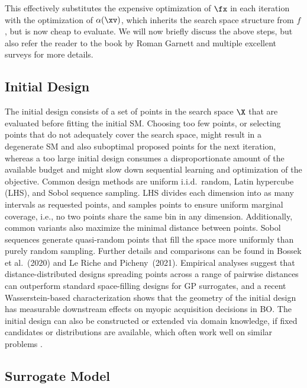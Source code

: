 \documentclass[12pt,letterpaper]{article}
\begin{document}
This effectively substitutes the expensive optimization of $\fx$ in each iteration with the optimization of $\alpha(\xv)$, which inherits the search space structure from $f$, but is now cheap to evaluate. 
We will now briefly discuss the above steps, but also refer the reader to the book by Roman Garnett\cite{garnett2023} and multiple excellent surveys\cite{brochu2010,shahriari2016,frazier2018} for more details. 


\subsection*{Initial Design}

\label{sec:initial-design}

The initial design consists of a set of points in the search space $\X$ that are evaluated before fitting the initial SM.
Choosing too few points, or selecting points that do not adequately cover the search space, might result in a degenerate SM and also suboptimal proposed points for the next iteration, whereas a too large initial design consumes a disproportionate amount of the available budget and might slow down sequential learning and optimization of the objective. 
Common design methods are uniform i.i.d.\ random, Latin hypercube (LHS), and Sobol sequence sampling.
LHS divides each dimension into as many intervals as requested points, and samples points to ensure uniform marginal coverage, i.e., no two points share the same bin in any dimension. Additionally, common variants also maximize the minimal distance between points.
Sobol sequences generate quasi-random points that fill the space more uniformly than purely random sampling.
Further details and comparisons can be found in Bossek et al.~(2020)\cite{bossek2020} and Le Riche and Picheny~(2021)\cite{leriche2021}.
Empirical analyses suggest that distance-distributed designs spreading points across a range of pairwise distances can outperform standard space-filling designs for GP surrogates\cite{zhang2021}, and a recent Wasserstein-based characterization shows that the geometry of the initial design has measurable downstream effects on myopic acquisition decisions in BO\cite{candelieri2026}.
The initial design can also be constructed or extended via domain knowledge, if fixed candidates or distributions are available, which often work well on similar problems 
\cite{feurer2015}.



\subsection*{Surrogate Model}
\end{document}
